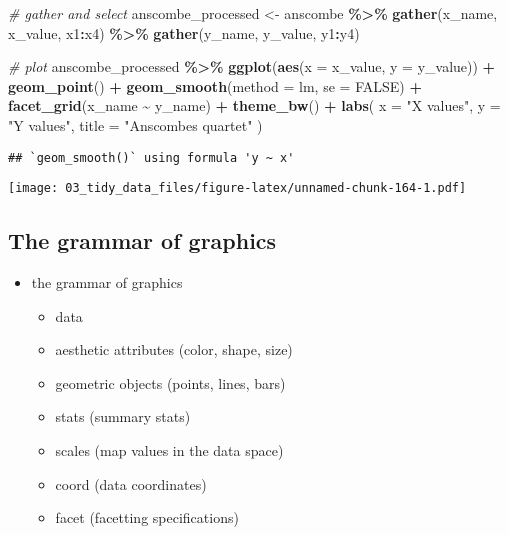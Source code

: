 \documentclass[
]{book}
\newenvironment{Shaded}{\begin{snugshade}}{\end{snugshade}}
\newcommand{\CommentTok}[1]{\textcolor[rgb]{0.56,0.35,0.01}{\textit{#1}}}
\newcommand{\DataTypeTok}[1]{\textcolor[rgb]{0.13,0.29,0.53}{#1}}
\newcommand{\KeywordTok}[1]{\textcolor[rgb]{0.13,0.29,0.53}{\textbf{#1}}}
\newcommand{\NormalTok}[1]{#1}
\newcommand{\OperatorTok}[1]{\textcolor[rgb]{0.81,0.36,0.00}{\textbf{#1}}}
\newcommand{\OtherTok}[1]{\textcolor[rgb]{0.56,0.35,0.01}{#1}}
\newcommand{\StringTok}[1]{\textcolor[rgb]{0.31,0.60,0.02}{#1}}
\providecommand{\tightlist}{%
  \setlength{\itemsep}{0pt}\setlength{\parskip}{0pt}}
\begin{document}
\begin{Shaded}
\begin{Highlighting}[]
\CommentTok{\# gather and select}
\NormalTok{anscombe\_processed \textless{}{-}}\StringTok{ }\NormalTok{anscombe }\OperatorTok{\%\textgreater{}\%}
\StringTok{  }\KeywordTok{gather}\NormalTok{(x\_name, x\_value, x1}\OperatorTok{:}\NormalTok{x4) }\OperatorTok{\%\textgreater{}\%}
\StringTok{  }\KeywordTok{gather}\NormalTok{(y\_name, y\_value, y1}\OperatorTok{:}\NormalTok{y4)}

\CommentTok{\# plot}
\NormalTok{anscombe\_processed }\OperatorTok{\%\textgreater{}\%}
\StringTok{  }\KeywordTok{ggplot}\NormalTok{(}\KeywordTok{aes}\NormalTok{(}\DataTypeTok{x =}\NormalTok{ x\_value, }\DataTypeTok{y =}\NormalTok{ y\_value)) }\OperatorTok{+}
\StringTok{  }\KeywordTok{geom\_point}\NormalTok{() }\OperatorTok{+}
\StringTok{  }\KeywordTok{geom\_smooth}\NormalTok{(}\DataTypeTok{method =}\NormalTok{ lm, }\DataTypeTok{se =} \OtherTok{FALSE}\NormalTok{) }\OperatorTok{+}
\StringTok{  }\KeywordTok{facet\_grid}\NormalTok{(x\_name }\OperatorTok{\textasciitilde{}}\StringTok{ }\NormalTok{y\_name) }\OperatorTok{+}
\StringTok{  }\KeywordTok{theme\_bw}\NormalTok{() }\OperatorTok{+}
\StringTok{  }\KeywordTok{labs}\NormalTok{(}
    \DataTypeTok{x =} \StringTok{"X values"}\NormalTok{,}
    \DataTypeTok{y =} \StringTok{"Y values"}\NormalTok{,}
    \DataTypeTok{title =} \StringTok{"Anscombe\textquotesingle{}s quartet"}
\NormalTok{  )}
\end{Highlighting}
\end{Shaded}

\begin{verbatim}
## `geom_smooth()` using formula 'y ~ x'
\end{verbatim}

\texttt{[image: 03\_tidy\_data\_files/figure-latex/unnamed-chunk-164-1.pdf]}

\hypertarget{the-grammar-of-graphics}{%
\subsection{The grammar of graphics}\label{the-grammar-of-graphics}}

\begin{itemize}
\item
  the grammar of graphics

  \begin{itemize}
  \tightlist
  \item
    data
  \item
    aesthetic attributes (color, shape, size)
  \item
    geometric objects (points, lines, bars)
  \item
    stats (summary stats)
  \item
    scales (map values in the data space)
  \item
    coord (data coordinates)
  \item
    facet (facetting specifications)
  \end{itemize}
\end{itemize}
\end{document}
